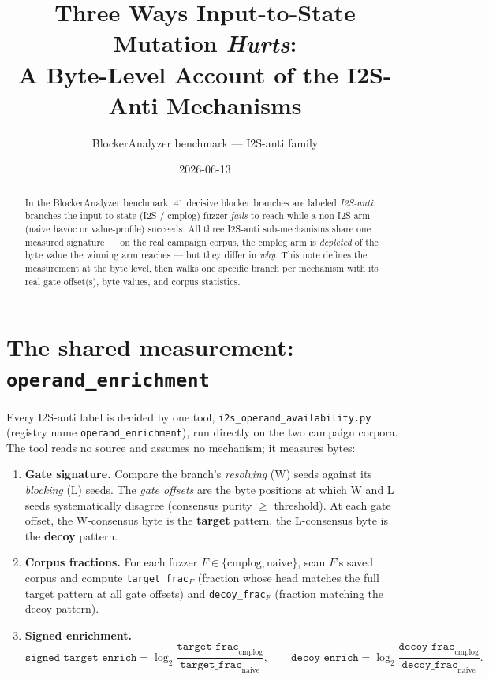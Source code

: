 \documentclass[11pt]{article}
\title{Three Ways Input-to-State Mutation \emph{Hurts}:\\
A Byte-Level Account of the I2S-Anti Mechanisms}
\author{BlockerAnalyzer benchmark --- I2S-anti family}
\date{2026-06-13}
\begin{document}
\maketitle

\begin{abstract}
In the BlockerAnalyzer benchmark, 41 decisive blocker branches are labeled
\emph{I2S-anti}: branches the input-to-state (I2S / cmplog) fuzzer
\emph{fails} to reach while a non-I2S arm (naive havoc or value-profile)
succeeds. All three I2S-anti sub-mechanisms share one measured signature ---
on the real campaign corpus, the cmplog arm is \emph{depleted} of the byte
value the winning arm reaches --- but they differ in \emph{why}. This note
defines the measurement at the byte level, then walks one specific branch per
mechanism with its real gate offset(s), byte values, and corpus statistics.
\end{abstract}

\section{The shared measurement: \texttt{operand\_enrichment}}

Every I2S-anti label is decided by one tool,
\texttt{i2s\_operand\_availability.py} (registry name
\texttt{operand\_enrichment}), run directly on the two campaign corpora.
The tool reads no source and assumes no mechanism; it measures bytes:

\begin{enumerate}[itemsep=2pt]
  \item \textbf{Gate signature.} Compare the branch's \emph{resolving} (W)
  seeds against its \emph{blocking} (L) seeds. The \emph{gate offsets} are the
  byte positions at which W and L seeds systematically disagree (consensus
  purity $\ge$ threshold). At each gate offset, the W-consensus byte is the
  \textbf{target} pattern, the L-consensus byte is the \textbf{decoy} pattern.
  \item \textbf{Corpus fractions.} For each fuzzer $F\in\{\textrm{cmplog},
  \textrm{naive}\}$, scan $F$'s saved corpus and compute
  \texttt{target\_frac}$_F$ (fraction whose head matches the full target
  pattern at all gate offsets) and \texttt{decoy\_frac}$_F$ (fraction matching
  the decoy pattern).
  \item \textbf{Signed enrichment.}
  \[
    \texttt{signed\_target\_enrich}=\log_2\!\frac{\texttt{target\_frac}_{\textrm{cmplog}}}
    {\texttt{target\_frac}_{\textrm{naive}}},\qquad
    \texttt{decoy\_enrich}=\log_2\!\frac{\texttt{decoy\_frac}_{\textrm{cmplog}}}
    {\texttt{decoy\_frac}_{\textrm{naive}}}.
  \]
\end{enumerate}
\end{document}
